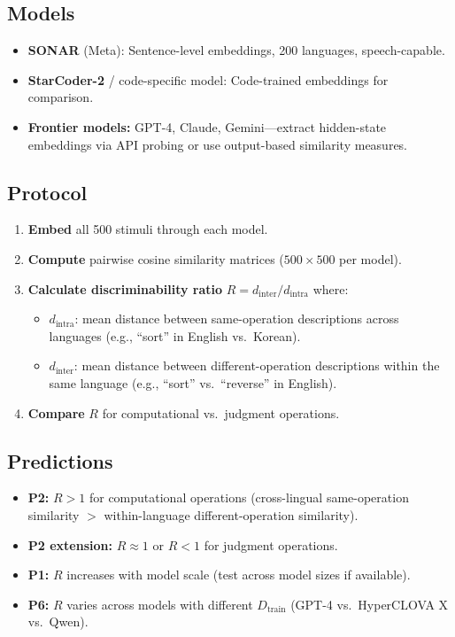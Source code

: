 \documentclass{article}
\theoremstyle{definition}
\newcommand{\Dtrain}{D_{\text{train}}}
\begin{document}
\subsection{Models}

\begin{itemize}[nosep]
  \item \textbf{SONAR} (Meta): Sentence-level embeddings, 200 languages, speech-capable.
  \item \textbf{StarCoder-2} / code-specific model: Code-trained embeddings for comparison.
  \item \textbf{Frontier models:} GPT-4, Claude, Gemini---extract hidden-state embeddings via API probing or use output-based similarity measures.
\end{itemize}

\subsection{Protocol}

\begin{enumerate}[nosep]
  \item \textbf{Embed} all 500 stimuli through each model.
  \item \textbf{Compute} pairwise cosine similarity matrices ($500 \times 500$ per model).
  \item \textbf{Calculate discriminability ratio} $R = d_{\text{inter}} / d_{\text{intra}}$ where:
    \begin{itemize}[nosep]
      \item $d_{\text{intra}}$: mean distance between same-operation descriptions across languages (e.g., ``sort'' in English vs.\ Korean).
      \item $d_{\text{inter}}$: mean distance between different-operation descriptions within the same language (e.g., ``sort'' vs.\ ``reverse'' in English).
    \end{itemize}
  \item \textbf{Compare} $R$ for computational vs.\ judgment operations.
\end{enumerate}

\subsection{Predictions}

\begin{itemize}[nosep]
  \item \textbf{P2:} $R > 1$ for computational operations (cross-lingual same-operation similarity $>$ within-language different-operation similarity).
  \item \textbf{P2 extension:} $R \approx 1$ or $R < 1$ for judgment operations.
  \item \textbf{P1:} $R$ increases with model scale (test across model sizes if available).
  \item \textbf{P6:} $R$ varies across models with different $\Dtrain$ (GPT-4 vs.\ HyperCLOVA X vs.\ Qwen).
\end{itemize}
\end{document}
